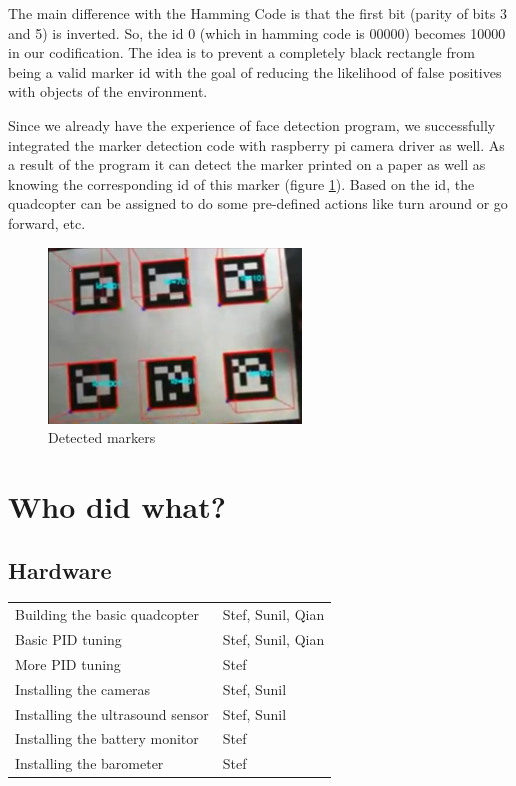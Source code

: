 \documentclass[11pt, a4paper, onecolumn, oneside, parskip=half]{scrartcl}
\begin{document}
The main difference with the Hamming Code is that the first bit (parity of bits 3 and 5) is inverted. So, the id 0 (which in hamming code is 00000) becomes 10000 in our codification. The idea is to prevent a completely black rectangle from being a valid marker id with the goal of reducing the likelihood of false positives with objects of the environment.

Since we already have the experience of face detection program, we successfully integrated the marker detection code with raspberry pi camera driver as well. As a result of the program it can detect the marker printed on a paper as well as knowing the corresponding id of this marker (figure \ref{fig:markerdetected}). Based on the id, the quadcopter can be assigned to do some pre-defined actions like turn around or go forward, etc.

\begin{figure}[ht]
\centering
\includegraphics[width=0.6\textwidth]{image05}
\caption{Detected markers}
\label{fig:markerdetected}
\end{figure}

\FloatBarrier
\hbox{}
\newpage
\appendix

\section{Who did what?}
\subsection{Hardware}
\begin{tabular}{ll}
Building the basic quadcopter & Stef, Sunil, Qian \\
Basic PID tuning & Stef, Sunil, Qian \\
More PID tuning & Stef \\
Installing the cameras & Stef, Sunil \\
Installing the ultrasound sensor & Stef, Sunil \\
Installing the battery monitor & Stef \\
Installing the barometer & Stef \\
\end{tabular}
\end{document}
